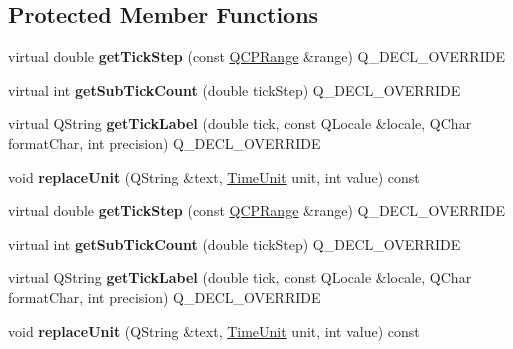 \subsection*{Protected Member Functions}
\begin{DoxyCompactItemize}
\item 
\mbox{\label{class_q_c_p_axis_ticker_time_a5615064642090fe193797caea8b98cb4}} 
virtual double {\bfseries get\+Tick\+Step} (const \hyperlink{class_q_c_p_range}{Q\+C\+P\+Range} \&range) Q\+\_\+\+D\+E\+C\+L\+\_\+\+O\+V\+E\+R\+R\+I\+DE
\item 
\mbox{\label{class_q_c_p_axis_ticker_time_acace84c46598176aa53837e147595471}} 
virtual int {\bfseries get\+Sub\+Tick\+Count} (double tick\+Step) Q\+\_\+\+D\+E\+C\+L\+\_\+\+O\+V\+E\+R\+R\+I\+DE
\item 
\mbox{\label{class_q_c_p_axis_ticker_time_a046eb771bdf2a959f570db542b3a0be6}} 
virtual Q\+String {\bfseries get\+Tick\+Label} (double tick, const Q\+Locale \&locale, Q\+Char format\+Char, int precision) Q\+\_\+\+D\+E\+C\+L\+\_\+\+O\+V\+E\+R\+R\+I\+DE
\item 
\mbox{\label{class_q_c_p_axis_ticker_time_a03b6c980be36f2672e3fc31d109a28a0}} 
void {\bfseries replace\+Unit} (Q\+String \&text, \hyperlink{class_q_c_p_axis_ticker_time_a5c48ded8c6d3a1aca9b68219469fea3e}{Time\+Unit} unit, int value) const
\item 
\mbox{\label{class_q_c_p_axis_ticker_time_a38462cd47fdca21bf6c1938eaad93c0c}} 
virtual double {\bfseries get\+Tick\+Step} (const \hyperlink{class_q_c_p_range}{Q\+C\+P\+Range} \&range) Q\+\_\+\+D\+E\+C\+L\+\_\+\+O\+V\+E\+R\+R\+I\+DE
\item 
\mbox{\label{class_q_c_p_axis_ticker_time_a08b898076e82b8ee6adcc027e1db92a7}} 
virtual int {\bfseries get\+Sub\+Tick\+Count} (double tick\+Step) Q\+\_\+\+D\+E\+C\+L\+\_\+\+O\+V\+E\+R\+R\+I\+DE
\item 
\mbox{\label{class_q_c_p_axis_ticker_time_a684c762479ac38be7c3cf9b378883147}} 
virtual Q\+String {\bfseries get\+Tick\+Label} (double tick, const Q\+Locale \&locale, Q\+Char format\+Char, int precision) Q\+\_\+\+D\+E\+C\+L\+\_\+\+O\+V\+E\+R\+R\+I\+DE
\item 
\mbox{\label{class_q_c_p_axis_ticker_time_a03b6c980be36f2672e3fc31d109a28a0}} 
void {\bfseries replace\+Unit} (Q\+String \&text, \hyperlink{class_q_c_p_axis_ticker_time_a5c48ded8c6d3a1aca9b68219469fea3e}{Time\+Unit} unit, int value) const
\end{DoxyCompactItemize}
